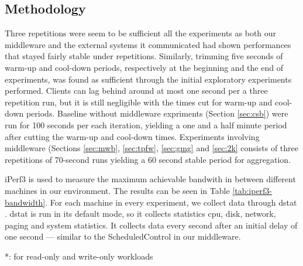 \documentclass[11pt,a4paper]{article}
\begin{document}
\subsection{Methodology} \label{sec:ov-methodology}
\par Three repetitions were seem to be sufficient all the experiments as both our middleware and the external systems it communicated had shown performances that stayed fairly stable under repetitions. Similarly, trimming five seconds of warm-up and cool-down periods, respectively at the beginning and the end of experiments, was found as sufficient through the initial exploratory experiments performed. Clients can lag behind around at most one second per a three repetition run, but it is still negligible with the times cut for warm-up and cool-down periods. Baseline without middleware expriments (Section \ref{sec:csb}) were run for 100 seconds per each iteration, yielding a one and a half minute period after cutting the warm-up and cool-down times. Experiments involving middleware (Sections \ref{sec:mwb}, \ref{sec:tpfw}, \ref{sec:gmg} and \ref{sec:2k} consists of three repetitions of 70-second runs yielding a 60 second stable period for aggregation.
\par iPerf3 \cite{iperf} is used to measure the maximum achievable bandwith in between different machines in our environment. The results can be seen in Table \ref{tab:iperf3-bandwidth}. For each machine in every experiment, we collect data through dstat \cite{dstat}. dstat is run in its default mode, so it collects statistics cpu, disk, network, paging and system  statistics. It collects data every second after an initial delay of one second — similar to the ScheduledControl in our middleware.
\begin{table}[h]
\centering
{}
{*: for read-only and write-only workloads}
\caption{Maximum achievable bandwidth values for all machines, obtained using iperf3. So-called ``effective bandwidth'' is the maximum bandwidth a machine can utilize only with the set queries or get replies. It is an informal measure that comes as useful while analyzing read-only and write-only workloads in later sections.} \label{tab:iperf3-bandwidth}
\end{table}
\end{document}
